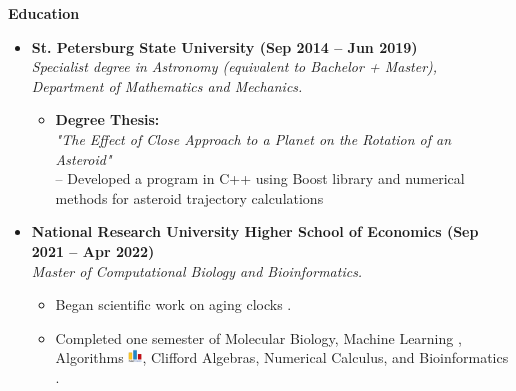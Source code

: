 \documentclass[12pt]{article}
\begin{document}
\vspace{1em}

\noindent \textbf{\Large Education}
\begin{itemize}
    \item \textbf{St. Petersburg State University (Sep 2014 -- Jun 2019)}\\
          \textit{Specialist degree in Astronomy (equivalent to Bachelor + Master), Department of Mathematics and Mechanics.}
          \begin{itemize}
              \item \textbf{Degree Thesis:} \\
                    \textit{"The Effect of Close Approach to a Planet on the Rotation of an Asteroid"} \\
                    -- Developed a program in C++ using Boost library and numerical methods for asteroid trajectory calculations \href{https://github.com/eluator/dipvlom}{\faGithub}
          \end{itemize}

\item \textbf{National Research University Higher School of Economics (Sep 2021 -- Apr 2022)}\\
          \textit{Master of Computational Biology and Bioinformatics.}
          \begin{itemize}
              \item Began scientific work on aging clocks \href{https://github.com/eluator/ResearchBioinf}{\faGithub}.
              \item Completed one semester of Molecular Biology, Machine Learning \href{https://github.com/eluator/HSE.machine_learning}{\faGithub}, Algorithms \href{https://codeforces.com/submissions/IgorTimofeev}{\includegraphics[height=1em]{codeforces-logo.png}}, Clifford Algebras, Numerical Calculus, and Bioinformatics \href{https://docs.google.com/presentation/d/1sv9-xaUu5Gb0dyn8ib7BOasO3S-FE03ZiIHD2kDEqIU/edit?usp=sharing}{\faChalkboardTeacher}.
          \end{itemize}
\end{itemize}

\vspace{1em}
\end{document}
